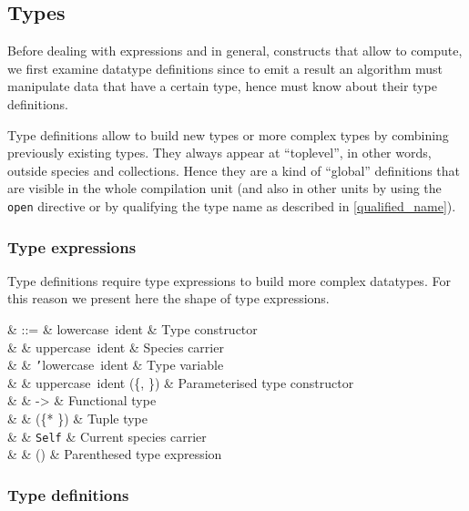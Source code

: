 \subsection{Types}
Before dealing with expressions and in general, constructs that allow
to compute, we first examine datatype definitions since to emit a
result an algorithm must manipulate data that have a certain type,
hence must know about their type definitions.

Type definitions allow to build new types or more complex types by
combining previously existing types. They always appear at
``toplevel'', in other words, outside species and collections. Hence
they are a kind of ``global'' definitions that are visible in the
whole compilation unit (and also in other units by using the
{\tt open} directive or by qualifying the type name as described in
\ref{qualified_name}).



\subsubsection{Type expressions}
Type definitions require type expressions to build more complex
datatypes. For this reason we present here the shape of type
expressions.

\vspace{0.2cm}
\begin{syntax}
\tau & ::= & lowercase\ ident   & Type constructor \\
     & \mid & uppercase\ ident & Species carrier \\
     & \mid & {\tt '}lowercase\ ident & Type variable \\
     & \mid & uppercase\ ident (\tau \{, \tau \}) & Parameterised type constructor \\
     & \mid & \tau -> \tau & Functional type \\
     & \mid & (\tau * \tau \{* \tau \}) & Tuple type \\
     & \mid & {\tt Self} & Current species carrier \\
     & \mid & (\tau) & Parenthesed type expression
\end{syntax}
\vspace{0.2cm}



\subsubsection{Type definitions}


